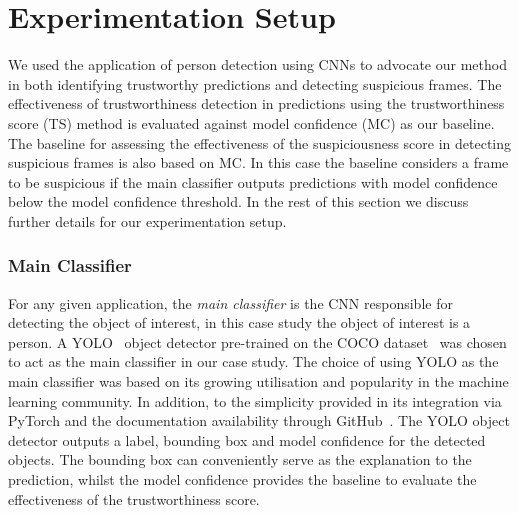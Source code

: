 \section{Experimentation Setup} \label{sec:experiment}
We used the application of person detection using CNNs to advocate our method in both identifying trustworthy predictions and detecting suspicious frames. 
%
The effectiveness of trustworthiness detection in predictions using the trustworthiness score (TS) method is evaluated against model confidence (MC) as our baseline. 
%
The baseline for assessing the effectiveness of the suspiciousness score in detecting suspicious frames is also based on MC.
%
In this case the baseline considers a frame to be suspicious if the main classifier outputs predictions with model confidence below the model confidence threshold. 
%
In the rest of this section we discuss further details for our experimentation setup.

%
%

\subsubsection{Main Classifier}
For any given application, the \textit{main classifier} is the CNN responsible for detecting the object of interest, in this case study the object of interest is a person. 
%
A YOLO~\cite{Redmon2015} object detector pre-trained on the COCO dataset~\cite{COCO_dataset} was chosen to act as the main classifier in our case study. The choice of using YOLO as the main classifier was based on its growing utilisation and popularity in the machine learning community. In addition, to the simplicity provided in its integration via PyTorch and the documentation availability through GitHub~\cite{Jocher_YOLOv5_by_Ultralytics_2020}. 
%
The YOLO object detector outputs a label, bounding box and model confidence for the detected objects. The bounding box can conveniently serve as the explanation to the prediction, whilst the model confidence provides the baseline to evaluate the effectiveness of the trustworthiness score.


